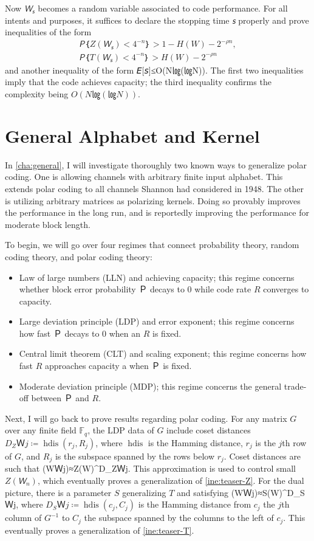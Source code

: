 \documentclass[openany]{amsbook}
\numberwithin{equation}{chapter}
\numberwithin{figure}{chapter}
\numberwithin{table}{chapter}
\DeclareMathOperator\hdis{hdis}
\def\[#1\]{\begin{equation*}{#1}\end{equation*}}
\theoremstyle{definition}	理dfn:Definition~?s			理exa:Example~?s
\theoremstyle{remark}		理cla:Claim~?s				理rem:Remark~?s
\begin{document}
	Now $𝘞_𝘴$ becomes a random variable associated to code performance.
	For all intents and purposes, it suffices to declare
	the stopping time $𝘴$ properly and prove inequalities of the form
	\begin{gather*}
		𝘗｛Z(𝘞_𝘴)<4^{-n}｝>1-H(W)-2^{-ρn},	\\
		𝘗｛T(𝘞_𝘴)<4^{-n}｝>H(W)-2^{-ρn}
	\end{gather*}
	and another inequality of the form
	\[N𝘌[𝘴]≤O(N㏒(㏒N)).\]
	The first two inequalities imply that the code achieves capacity;
	the third inequality confirms the complexity being $O(N㏒(㏒N))$.

\section{General Alphabet and Kernel}

	In \cref{cha:general}, I will investigate thoroughly
	two known ways to generalize polar coding.
	One is allowing channels with arbitrary finite input alphabet.
	This extends polar coding to all channels Shannon had considered in 1948.
	The other is utilizing arbitrary matrices as polarizing kernels.
	Doing so provably improves the performance in the long run,
	and is reportedly improving the performance for moderate block length.
	
	To begin, we will go over four regimes that connect
	probability theory, random coding theory, and polar coding theory:
	\begin{itemize}
		\item	Law of large numbers (LLN) and achieving capacity;
				this regime concerns whether block error probability $Ｐ$
				decays to $0$ while code rate $R$ converges to capacity.
		\item	Large deviation principle (LDP) and error exponent;
				this regime concerns how fast $Ｐ$ decays to $0$ when an $R$ is fixed.
		\item	Central limit theorem (CLT) and scaling exponent; this regime
				concerns how fast $R$ approaches capacity a when $Ｐ$ is fixed.
		\item	Moderate deviation principle (MDP);
				this regime concerns the general trade-off between $Ｐ$ and $R$.
	\end{itemize}
	
	Next, I will go back to prove results regarding polar coding.
	For any matrix $G$ over any finite field $𝔽_q$,
	the LDP data of $G$ include coset distances $D_ZＷj≔\hdis(r_j,R_j)$,
	where $\hdis$ is the Hamming distance, $r_j$ is the $j$th row of $G$,
	and $R_j$ is the subspace spanned by the rows below $r_j$.
	Coset distances are such that
	\[Z(WＷj)≈Z(W)^{D_ZＷj}.\]
	This approximation is used to control small $Z(𝘞_n)$,
	which eventually proves a generalization of \cref{ine:teaser-Z}.
	For the dual picture, there is a parameter $S$ generalizing $T$ and satisfying
	\[S(WＷj)≈S(W)^{D_SＷj},\]
	where $D_SＷj≔\hdis(c_j,C_j)$ is the Hamming distance from $c_j$ the $j$th column
	of $G^{-1}$ to $C_j$ the subspace spanned by the columns to the left of $c_j$.
	This eventually proves a generalization of \cref{ine:teaser-T}.
	
\end{document}
